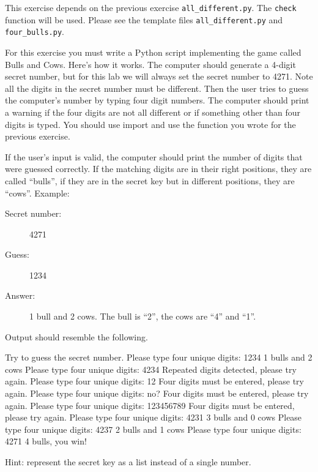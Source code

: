 \documentclass[11pt]{cselabheader}
\begin{document}
\begin{ex}
This exercise depends on the previous exercise \texttt{all\_different.py}. The \texttt{check} function will be used. Please see the template files \texttt{all\_different.py} and \texttt{four\_bulls.py}.

For this exercise you must write a Python script implementing the game
called Bulls and Cows. Here's how it works.
The computer should generate a 4-digit secret number, but for this lab we will
always set the secret number to 4271. Note all the digits in the secret
number  must be different. Then the user tries to guess the computer's number
by typing four digit numbers. The computer should print a warning if the four
digits are not all different or if something other than four digits is typed.
You should use import and use the function you wrote for the previous exercise.

If the user's input is valid, the computer should print the number of digits
that were guessed correctly. If the matching digits are in their right
positions, they are called ``bulls'', if they are in the secret key but in
different positions, they are ``cows''. Example:

\begin{description}
\item[Secret number:] 4271
\item[Guess:] 1234
\item[Answer:] 1 bull and 2 cows. The bull is ``2'', the cows are ``4'' and ``1''.
\end{description}

Output should resemble the following.

\begin{verbatimcode}
Try to guess the secret number.
Please type four unique digits: 1234
1 bulls and 2 cows
Please type four unique digits: 4234
Repeated digits detected, please try again.
Please type four unique digits: 12
Four digits must be entered, please try again.
Please type four unique digits: no?
Four digits must be entered, please try again.
Please type four unique digits: 123456789
Four digits must be entered, please try again.
Please type four unique digits: 4231
3 bulls and 0 cows
Please type four unique digits: 4237
2 bulls and 1 cows
Please type four unique digits: 4271
4 bulls, you win!
\end{verbatimcode}

Hint: represent the secret key as a list instead of a single number.
\end{ex}
\end{document}
